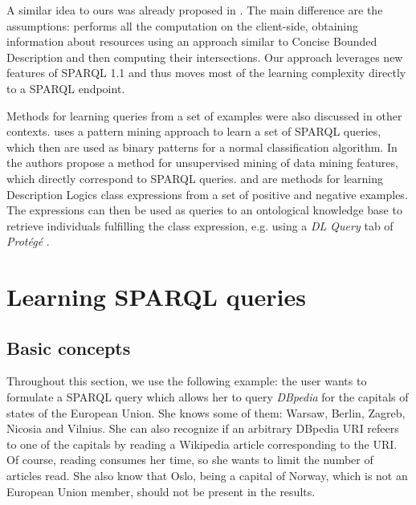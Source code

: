 \documentclass{llncs}
\newcommand{\protege}{\emph{Prot\'eg\'e}}
\begin{document}
A similar idea to ours was already proposed in \cite{DBLP:conf/esws/LehmannB11}.
The main difference are the assumptions: \cite{DBLP:conf/esws/LehmannB11} performs all the computation on the client-side, obtaining information about resources using an approach similar to Concise Bounded Description \cite{cbd} and then computing their intersections.
Our approach leverages new features of SPARQL 1.1 and thus moves most of the learning complexity directly to a SPARQL endpoint.

Methods for learning queries from a set of examples were also discussed in other contexts.
\cite{DBLP:journals/ijswis/LawrynowiczP14} uses a pattern mining approach to learn a set of SPARQL queries, which then are used as binary patterns for a normal classification algorithm.
In \cite{DBLP:conf/wims/PaulheimF12} the authors propose a method for unsupervised mining of data mining features, which directly correspond to SPARQL queries.
\cite{DBLP:journals/jmlr/Lehmann09} and \cite{DBLP:conf/ilp/FanizzidE08} are methods for learning Description Logics class expressions from a set of positive and negative examples.
The expressions can then be used as queries to an ontological knowledge base to retrieve individuals fulfilling the class expression, e.g. using a \emph{DL Query} tab of \protege{} \cite{DBLP:journals/ijmms/GennariMFGCENT03}.

\section{Learning SPARQL queries\label{sec:algorithm}}

\subsection{Basic concepts}

Throughout this section, we use the following example: the user wants to formulate a SPARQL query which allows her to query \emph{DBpedia} \cite{DBLP:conf/semweb/AuerBKLCI07} for the capitals of states of the European Union.
She knows some of them: Warsaw, Berlin, Zagreb, Nicosia and Vilnius.
She can also recognize if an arbitrary DBpedia URI refeers to one of the capitals by reading a Wikipedia article corresponding to the URI.
Of course, reading consumes her time, so she wants to limit the number of articles read.
She also know that Oslo, being a capital of Norway, which is not an European Union member, should not be present in the results.
\end{document}

